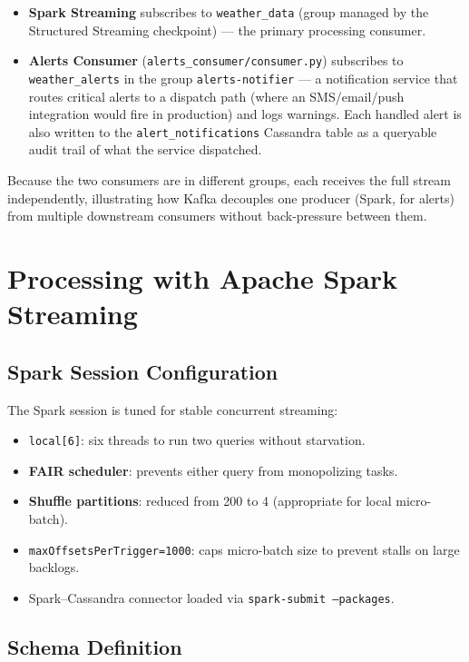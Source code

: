 \documentclass[conference,a4paper]{IEEEtran}
\begin{document}
\begin{itemize}
  \item \textbf{Spark Streaming} subscribes to \texttt{weather\_data} (group
        managed by the Structured Streaming checkpoint) --- the primary
        processing consumer.
  \item \textbf{Alerts Consumer} (\texttt{alerts\_consumer/consumer.py})
        subscribes to \texttt{weather\_alerts} in the group
        \texttt{alerts-notifier} --- a notification service that routes critical
        alerts to a dispatch path (where an SMS/email/push integration would
        fire in production) and logs warnings. Each handled alert is also
        written to the \texttt{alert\_notifications} Cassandra table as a
        queryable audit trail of what the service dispatched.
\end{itemize}

Because the two consumers are in different groups, each receives the full stream
independently, illustrating how Kafka decouples one producer (Spark, for alerts)
from multiple downstream consumers without back-pressure between them.

\section{Processing with Apache Spark Streaming}

\subsection{Spark Session Configuration}

The Spark session is tuned for stable concurrent streaming:
\begin{itemize}
  \item \texttt{local[6]}: six threads to run two queries without starvation.
  \item \textbf{FAIR scheduler}: prevents either query from monopolizing tasks.
  \item \textbf{Shuffle partitions}: reduced from 200 to 4 (appropriate for local micro-batch).
  \item \texttt{maxOffsetsPerTrigger=1000}: caps micro-batch size to prevent stalls on large backlogs.
  \item Spark--Cassandra connector loaded via \texttt{spark-submit --packages}.
\end{itemize}

\subsection{Schema Definition}
\end{document}
